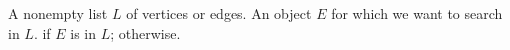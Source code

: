 
\begin{algorithmic}[1]
\Require A nonempty list $L$ of vertices or edges. An object $E$ for
  which we want to search in $L$.
\Ensure \MyTrue if $E$ is in $L$; \MyFalse otherwise.
    \State \Return \MyTrue
  \EndIf
\EndFor
\State \Return \MyFalse
\end{algorithmic}
